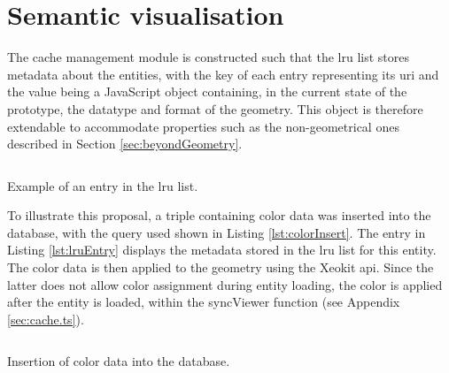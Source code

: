 \section{Semantic visualisation}
The cache management module is constructed such that the \ac{lru} list stores metadata about the entities, with the key of each entry representing its \ac{uri} and the value being a JavaScript object containing, in the current state of the prototype, the datatype and format of the geometry. This object is therefore extendable to accommodate properties such as the non-geometrical ones described in Section \ref{sec:beyondGeometry}.

\begin{listing}[H]
    \inputminted{json}{dynamicQueries/colorize/entry.json}
    \caption[LRU entry]{Example of an entry in the \ac{lru} list.}
    \label{lst:lruEntry}
\end{listing}

To illustrate this proposal, a triple containing color data was inserted into the database, with the query used shown in Listing \ref{lst:colorInsert}. The entry in Listing \ref{lst:lruEntry} displays the metadata stored in the \ac{lru} list for this entity. The color data is then applied to the geometry using the Xeokit \ac{api}. Since the latter does not allow color assignment during entity loading, the color is applied after the entity is loaded, within the syncViewer function (see Appendix \ref{sec:cache.ts}).

\begin{listing}[H]
    \inputminted{sparql}{dynamicQueries/colorize/insert.rq}
    \caption[Insert color data]{Insertion of color data into the database.}
    \label{lst:colorInsert}
\end{listing}

